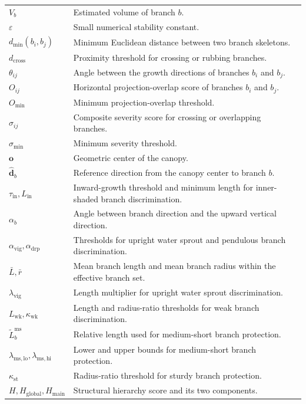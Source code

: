 \documentclass[12pt,a4paper,fontset=fandol]{ctexart}
\begin{document}
\begin{longtable}{>{\raggedright\arraybackslash}p{}
                  >{\raggedright\arraybackslash}p{}}
$V_b$ & Estimated volume of branch $b$. \\
$\varepsilon$ & Small numerical stability constant. \\
$d_{\min}(b_i,b_j)$ & Minimum Euclidean distance between two branch skeletons. \\
$d_{\mathrm{cross}}$ & Proximity threshold for crossing or rubbing branches. \\
$\theta_{ij}$ & Angle between the growth directions of branches $b_i$ and $b_j$. \\
$O_{ij}$ & Horizontal projection-overlap score of branches $b_i$ and $b_j$. \\
$O_{\min}$ & Minimum projection-overlap threshold. \\
$\sigma_{ij}$ & Composite severity score for crossing or overlapping branches. \\
$\sigma_{\min}$ & Minimum severity threshold. \\
$\mathbf{o}$ & Geometric center of the canopy. \\
$\hat{\mathbf{d}}_b$ & Reference direction from the canopy center to branch $b$. \\
$\tau_{\mathrm{in}}, L_{\mathrm{in}}$ & Inward-growth threshold and minimum length for inner-shaded branch discrimination. \\
$\alpha_b$ & Angle between branch direction and the upward vertical direction. \\
$\alpha_{\mathrm{vig}}, \alpha_{\mathrm{drp}}$ & Thresholds for upright water sprout and pendulous branch discrimination. \\
$\bar{L}, \bar{r}$ & Mean branch length and mean branch radius within the effective branch set. \\
$\lambda_{\mathrm{vig}}$ & Length multiplier for upright water sprout discrimination. \\
$L_{\mathrm{wk}}, \kappa_{\mathrm{wk}}$ & Length and radius-ratio thresholds for weak branch discrimination. \\
$\tilde{L}_b^{\mathrm{ms}}$ & Relative length used for medium-short branch protection. \\
$\lambda_{\mathrm{ms,lo}}, \lambda_{\mathrm{ms,hi}}$ & Lower and upper bounds for medium-short branch protection. \\
$\kappa_{\mathrm{st}}$ & Radius-ratio threshold for sturdy branch protection. \\
$H, H_{\mathrm{global}}, H_{\mathrm{main}}$ & Structural hierarchy score and its two components. \\

\end{longtable}
\end{document}
